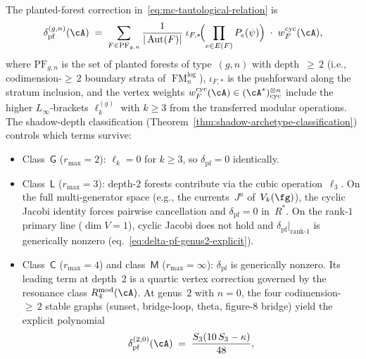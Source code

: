 \begin{remark}
\label{rem:planted-forest-correction-explicit}
The planted-forest correction
in~\eqref{eq:mc-tautological-relation} is
\begin{equation}\label{eq:delta-pf-explicit}
\delta_{\mathrm{pf}}^{(g,n)}(\cA)
\;=\;
\sum_{F \in \mathrm{PF}_{g,n}}
\frac{1}{|\operatorname{Aut}(F)|}
\;\iota_{F,*}\!\Bigl(
\prod_{e \in E(F)} P_e(\psi)
\Bigr)
\;\cdot\;
w_F^{\mathrm{cyc}}(\cA),
\end{equation}
where $\mathrm{PF}_{g,n}$ is the set of planted forests of
type~$(g,n)$ with depth~${\geq}\,2$
(i.e., codimension-${\geq}\,2$ boundary strata of
$\operatorname{FM}_n^{\mathrm{log}}$),
$\iota_{F,*}$ is the pushforward along the
stratum inclusion,
and the vertex weights
$w_F^{\mathrm{cyc}}(\cA) \in (\cA^*)^{\otimes n}_{\mathrm{cyc}}$
include the higher $L_\infty$-brackets
$\ell_k^{(g)}$ with $k \geq 3$
from the transferred modular operations.
The shadow-depth classification
(Theorem~\ref{thm:shadow-archetype-classification})
controls which terms survive:
\begin{itemize}
\item
  Class~$\mathsf{G}$ ($r_{\max} = 2$): $\ell_k = 0$ for $k \geq 3$,
  so $\delta_{\mathrm{pf}} = 0$ identically.
\item
  Class~$\mathsf{L}$ ($r_{\max} = 3$): depth-$2$ forests
  contribute via the cubic operation~$\ell_3$.
  On the full multi-generator space
  (e.g., the currents~$J^a$ of~$V_k(\fg)$),
  the cyclic Jacobi identity forces pairwise cancellation
  and $\delta_{\mathrm{pf}} = 0$ in~$R^*$.
  On the rank-$1$ primary line ($\dim V = 1$),
  cyclic Jacobi does not hold
  and $\delta_{\mathrm{pf}}|_{\mathrm{rank\text{-}1}}$ is
  generically nonzero
  (eq.~\eqref{eq:delta-pf-genus2-explicit}).
\item
  Class~$\mathsf{C}$ ($r_{\max} = 4$) and class~$\mathsf{M}$
  ($r_{\max} = \infty$): $\delta_{\mathrm{pf}}$ is generically
  nonzero.  Its leading term at depth~$2$ is a quartic vertex
  correction governed by the resonance class
  $R_4^{\mathrm{mod}}(\cA)$.
  At genus~$2$ with $n = 0$, the
  four codimension-${\geq}\,2$ stable graphs (sunset, bridge-loop,
  theta, figure-$8$ bridge) yield the explicit polynomial
  \begin{equation}\label{eq:delta-pf-genus2-explicit}
    \delta_{\mathrm{pf}}^{(2,0)}(\cA)
    \;=\;
    \frac{S_3(10\,S_3 - \kappa)}{48},

\end{equation}
\end{itemize}
\end{remark}
